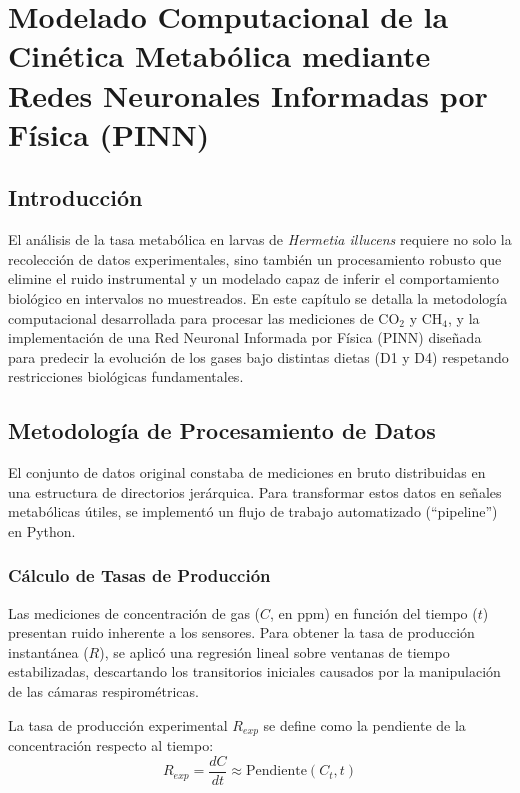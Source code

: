 \chapter{Modelado Computacional de la Cinética Metabólica mediante Redes Neuronales Informadas por Física (PINN)}

\section{Introducción}
El análisis de la tasa metabólica en larvas de \textit{Hermetia illucens} requiere no solo la recolección de datos experimentales, sino también un procesamiento robusto que elimine el ruido instrumental y un modelado capaz de inferir el comportamiento biológico en intervalos no muestreados. En este capítulo se detalla la metodología computacional desarrollada para procesar las mediciones de CO$_2$ y CH$_4$, y la implementación de una Red Neuronal Informada por Física (PINN) diseñada para predecir la evolución de los gases bajo distintas dietas (D1 y D4) respetando restricciones biológicas fundamentales.

\section{Metodología de Procesamiento de Datos}

El conjunto de datos original constaba de mediciones en bruto distribuidas en una estructura de directorios jerárquica. Para transformar estos datos en señales metabólicas útiles, se implementó un flujo de trabajo automatizado (``pipeline'') en Python.

\subsection{Cálculo de Tasas de Producción}
Las mediciones de concentración de gas ($C$, en ppm) en función del tiempo ($t$) presentan ruido inherente a los sensores. Para obtener la tasa de producción instantánea ($R$), se aplicó una regresión lineal sobre ventanas de tiempo estabilizadas, descartando los transitorios iniciales causados por la manipulación de las cámaras respirométricas.

La tasa de producción experimental $R_{exp}$ se define como la pendiente de la concentración respecto al tiempo:
\begin{equation}
    R_{exp} = \frac{dC}{dt} \approx \text{Pendiente}(C_{t}, t)
\end{equation}

